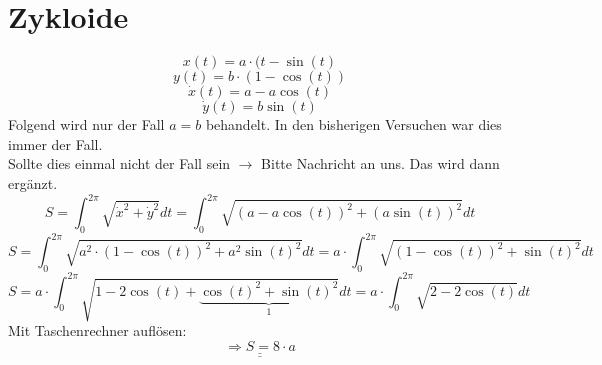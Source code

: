 \section{Zykloide}
\[ x(t) = a \cdot (t - \sin(t) \]
\[ y(t) = b \cdot (1 - \cos(t)) \]
\[ \dot{x}(t) = a - a \cos(t) \]
\[ \dot{y}(t) = b \sin(t) \]
Folgend wird nur der Fall $a = b$ behandelt. In den bisherigen Versuchen war dies immer der Fall. \\Sollte dies einmal nicht der Fall sein $\rightarrow$ Bitte Nachricht an uns. Das wird dann ergänzt. 
\[ S = \int_0^{2\pi} \sqrt{\dot{x}^2 + \dot{y}^2} dt = \int_0^{2\pi} \sqrt{(a - a \cos(t))^2 + (a \sin(t))^2} dt \]
\[ S = \int_0^{2\pi} \sqrt{a^2 \cdot (1 - \cos(t))^2 + a^2 \sin(t)^2} dt = a \cdot \int_0^{2\pi} \sqrt{(1 - \cos(t))^2 + \sin(t)^2} dt \]
\[ S = a \cdot \int_0^{2\pi} \sqrt{1 - 2 \cos(t) + \underbrace{\cos(t)^2 + \sin(t)^2}_1} dt = a \cdot \int_0^{2\pi} \sqrt{2 - 2 \cos(t)} dt \]
Mit Taschenrechner auflösen: 
\[ \underline{\underline{\Rightarrow S = 8 \cdot a}} \]

